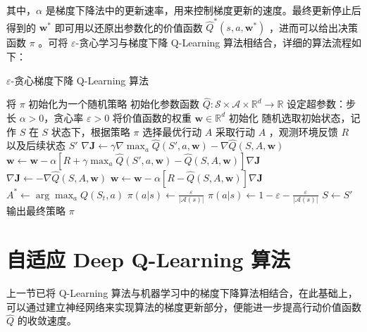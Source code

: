 其中，$\alpha$ 是梯度下降法中的更新速率，用来控制梯度更新的速度。最终更新停止后得到的 $\boldsymbol{w}^*$ 即可用以还原出参数化的价值函数 $\widehat{Q}^*(s,a,\boldsymbol{w}^*)$ ，进而可以给出决策函数 $\pi$ 。可将 $\varepsilon$-贪心学习与梯度下降 Q-Learning 算法相结合，详细的算法流程如下：

\begin{algorithm}[H]
    \caption{$\varepsilon$-贪心梯度下降 Q-Learning 算法}
    \begin{algorithmic}[1] %
        \State 将 $\pi$ 初始化为一个随机策略
        \State 初始化参数函数 $\widehat{Q} : \mathcal{S} \times \mathcal{A} \times \mathbb{R}^{d} \rightarrow \mathbb{R}$
        \State 设定超参数：步长 $\alpha>0$，贪心率 $\varepsilon>0$
        \State 将价值函数的权重 $\boldsymbol{w}\in\mathbb{R}^d$ 初始化
        \Loop
        \State 随机选取初始状态，记作 $S$
        \Repeat
        \State 在 $S$ 状态下，根据策略 $\pi$ 选择最优行动 $A$
        \State 采取行动 $A$ ，观测环境反馈 $R$ 以及后续状态 $S'$
        \State $\nabla\boldsymbol{J}\leftarrow \gamma\nabla\max_a\widehat{Q}(S',a,\boldsymbol{w})-\nabla\widehat{Q}(S,A,\boldsymbol{w})$
        \State $\boldsymbol{w}\leftarrow\boldsymbol{w} - \alpha\left[R+\gamma\max_a\widehat{Q}(S',a,\boldsymbol{w})-\widehat{Q}(S,A,\boldsymbol{w})\right]\nabla\boldsymbol{J}$
        \Else
        \State $\nabla\boldsymbol{J}\leftarrow -\nabla\widehat{Q}(S,A,\boldsymbol{w})$
        \State $\boldsymbol{w}\leftarrow\boldsymbol{w} - \alpha\left[R-\widehat{Q}(S,A,\boldsymbol{w})\right]\nabla\boldsymbol{J}$
        \EndIf
        \State $A^*\leftarrow\arg\max_aQ(S_t,a)$
        \State $\pi(a|s)\leftarrow \frac{\varepsilon}{|\mathcal A(s)|}$
        \Else
        \State $\pi(a|s)\leftarrow 1-\varepsilon-\frac{\varepsilon}{|\mathcal A(s)|}$
        \EndIf
        \EndFor
        \State $S\leftarrow S'$
        \EndLoop
        \State
        \State 输出最终策略 $\pi$
    \end{algorithmic}
\end{algorithm}

\section{自适应 Deep Q-Learning 算法}

上一节已将 Q-Learning 算法与机器学习中的梯度下降算法相结合，在此基础上，可以通过建立神经网络来实现算法的梯度更新部分\cite{hecht1992theory}，便能进一步提高行动价值函数 $\widehat{Q}$ 的收敛速度。

